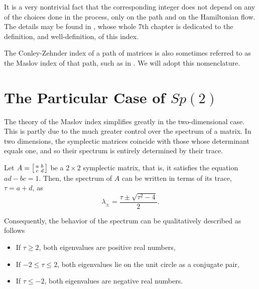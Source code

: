 It is a very nontrivial fact that the corresponding integer does not depend on any of the choices done in the process, only on the path and on the Hamiltonian flow. The details may be found in \cite{audin}, whose whole 7th chapter is dedicated to the definition, and well-definition, of this index.

The Conley-Zehnder index of a path of matrices is also sometimes referred to as the Maslov index of that path, such as in \cite{audin}. We will adopt this nomenclature.

\section{The Particular Case of $Sp(2)$}\label{sec:maslovsp2}

The theory of the Maslov index simplifies greatly in the two-dimensional case. This is partly due to the much greater control over the spectrum of a matrix. In two dimensions, the symplectic matrices coincide with those whose determinant equals one, and so their spectrum is entirely determined by their trace.

\begin{prop}
Let $A = \mleft[\begin{smallmatrix} a & b \\ c & d \end{smallmatrix}\mright]$ be a $2 \times 2$ symplectic matrix, that is, it satisfies the equation $ad - bc = 1$. Then, the spectrum of $A$ can be written in terms of its trace, $\tau = a+d$, as
\begin{equation}\label{lambdafromtau}
\lambda_\pm = \frac{\tau \pm \sqrt{\tau^2 - 4}}2.
\end{equation}

Consequently, the behavior of the spectrum can be qualitatively described as follows
\begin{itemize}
\item If $\tau \geq 2$, both eigenvalues are positive real numbers,
\item If $-2 \leq \tau \leq 2$, both eigenvalues lie on the unit circle as a conjugate pair,
\item If $\tau \leq -2$, both eigenvalues are negative real numbers.
\end{itemize}
\end{prop}

